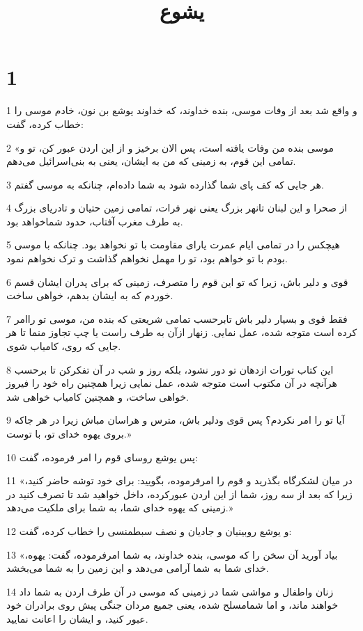 

\title{يشوع}

 
\chapter{1}

\par 1 و واقع شد بعد از وفات موسی، بنده خداوند، که خداوند یوشع بن نون، خادم موسی را خطاب کرده، گفت:
\par 2 «موسی بنده من وفات یافته است، پس الان برخیز و از این اردن عبور کن، تو و تمامی این قوم، به زمینی که من به ایشان، یعنی به بنی‌اسرائیل می‌دهم.
\par 3 هر جایی که کف پای شما گذارده شود به شما داده‌ام، چنانکه به موسی گفتم.
\par 4 از صحرا و این لبنان تانهر بزرگ یعنی نهر فرات، تمامی زمین حتیان و تادریای بزرگ به طرف مغرب آفتاب، حدود شماخواهد بود.
\par 5 هیچکس را در تمامی ایام عمرت یارای مقاومت با تو نخواهد بود. چنانکه با موسی بودم با تو خواهم بود، تو را مهمل نخواهم گذاشت و ترک نخواهم نمود.
\par 6 قوی و دلیر باش، زیرا که تو این قوم را متصرف، زمینی که برای پدران ایشان قسم خوردم که به ایشان بدهم، خواهی ساخت.
\par 7 فقط قوی و بسیار دلیر باش تابرحسب تمامی شریعتی که بنده من، موسی تو راامر کرده است متوجه شده، عمل نمایی. زنهار ازآن به طرف راست یا چپ تجاوز منما تا هر جایی که روی، کامیاب شوی.
\par 8 این کتاب تورات ازدهان تو دور نشود، بلکه روز و شب در آن تفکرکن تا برحسب هر‌آنچه در آن مکتوب است متوجه شده، عمل نمایی زیرا همچنین راه خود را فیروز خواهی ساخت، و همچنین کامیاب خواهی شد.
\par 9 آیا تو را امر نکردم؟ پس قوی ودلیر باش، مترس و هراسان مباش زیرا در هر جاکه بروی یهوه خدای تو، با توست.»
\par 10 پس یوشع روسای قوم را امر فرموده، گفت:
\par 11 «در میان لشکرگاه بگذرید و قوم را امرفرموده، بگویید: برای خود توشه حاضر کنید، زیرا که بعد از سه روز، شما از این اردن عبورکرده، داخل خواهید شد تا تصرف کنید در زمینی که یهوه خدای شما، به شما برای ملکیت می‌دهد.»
\par 12 و یوشع روبینیان و جادیان و نصف سبطمنسی را خطاب کرده، گفت:
\par 13 «بیاد آورید آن سخن را که موسی، بنده خداوند، به شما امرفرموده، گفت: یهوه، خدای شما به شما آرامی می‌دهد و این زمین را به شما می‌بخشد.
\par 14 زنان واطفال و مواشی شما در زمینی که موسی در آن طرف اردن به شما داد خواهند ماند، و اما شمامسلح شده، یعنی جمیع مردان جنگی پیش روی برادران خود عبور کنید، و ایشان را اعانت نمایید.
